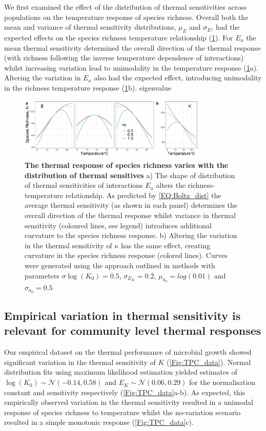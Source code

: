 \documentclass{article}
\begin{document}
We first examined the effect of the distribution of thermal sensitivities across populations on the temperature response of species richness. Overall both the mean and variance of thermal sensitivity distributions, $\mu_E$ and $\sigma_E$, had the expected effects on the species richness temperature relationship (\cref{Fig:N_vs_T}). For $E_a$ the mean thermal sensitivity determined the overall direction of the thermal response (with richness following the inverse temperature dependence of interactions) whilst increasing variation lead to unimodality in the temperature response (\cref{Fig:N_vs_T}a). Altering the variation in $E_{\kappa}$ also had the expected effect, introducing unimodality in the richness temperature response (\cref{Fig:N_vs_T}b). 
eigenvalue 
\begin{figure}[H] 
    \centering
    \includegraphics[width=0.8\textwidth]{docs/Figures/Fig_N_ana.pdf} 
    \caption{\textbf{The thermal response of species richness  varies with the distribution of thermal sensitives} a) The shape of distribution of thermal sensitivities of interactions $E_a$ alters the richness-temperature relationship. As predicted by \cref{EQ:Boltz_dist} the average thermal sensitivity (as shown in each panel) determines the overall direction of the thermal response whilst variance in thermal sensitivity (coloured lines, see legend) introduces additional curvature to the species richness response. b) Altering the variation in the thermal sensitivity of $\kappa$ has the same effect, creating curvature in  the species richness response (colored lines). Curves were generated using the approach outlined in methods with parameters $\sigma{\log(K_0)} = 0.5$, $\sigma_{E_K} = 0.2$, $\mu_{a_0} = log(0.01)$ and  $\sigma_{a_0} = 0.5$}
    \label{Fig:N_vs_T}
\end{figure}


\subsection*{Empirical variation in thermal sensitivity is relevant for community level thermal responses}

Our empirical dataset on the thermal performance of microbial growth showed significant variation in the thermal sensitivity of $K$ (\cref{Fig:TPC_data}). Normal distribution fits using maximum likelihood estimation yielded estimates of $\log(K_0) \sim \mathcal{N}(-0.14,0.58)$ and $E_K \sim \mathcal{N}(0.06,0.29)$ for the normalisation constant and sensitivity respectively (\cref{Fig:TPC_data}a-b). As expected, this empirically observed variation in the thermal sensitivity resulted in a unimodal response of species richness to temperature whilst the no-variation scenario resulted in a simple monotonic response (\cref{Fig:TPC_data}c). 
\end{document}
